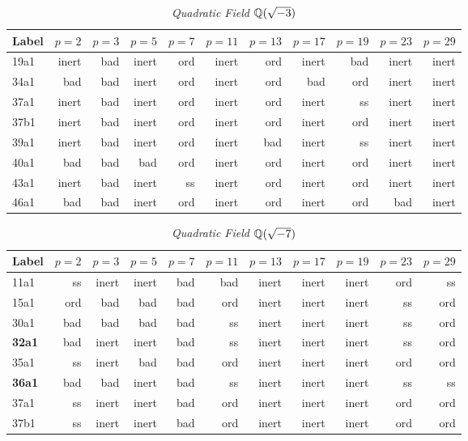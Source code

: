 \documentclass[a4paper,11pt]{article}
\numberwithin{equation}{section}
\begin{document}
\begin{table}[H]	\caption{\label{table:ordinary}\emph{Quadratic Field $\mathbb{Q}(\sqrt{-3})$}}
\begin{tabular}[t]{lrrrrrrrrrr}
	\toprule
Label   &  $p=2$ & $p=3$ & $p=5$ & $p=7$ & $p=11$ & $p=13$ & $p=17$ & $p=19$ & $p=23$ & $p=29$

\\ \midrule 19a1&inert&bad &inert&ord&inert&ord&inert&bad &inert&inert\\ \midrule 34a1&bad &bad &inert&ord&inert&ord&bad &ord&inert&inert\\ \midrule 37a1&inert&bad &inert&ord&inert&ord&inert&ss&inert&inert\\ \midrule 37b1&inert&bad &inert&ord&inert&ord&inert&ord&inert&inert\\ \midrule 39a1&inert&bad &inert&ord&inert&bad &inert&ss&inert&inert\\ \midrule 40a1&bad &bad &bad &ord&inert&ord&inert&ord&inert&inert\\ \midrule 43a1&inert&bad &inert&ss&inert&ord&inert&ord&inert&inert\\ \midrule 46a1&bad &bad &inert&ord&inert&ord&inert&ord&bad &inert

\\
\bottomrule
\end{tabular}
\end{table}

\begin{table}[H]	\caption{\label{table:ordinary}\emph{Quadratic Field $\mathbb{Q}(\sqrt{-7})$}}
\begin{tabular}[t]{lrrrrrrrrrr}
	\toprule
Label   &  $p=2$ & $p=3$ & $p=5$ & $p=7$ & $p=11$ & $p=13$ & $p=17$ & $p=19$ & $p=23$ & $p=29$

\\ \midrule 11a1&ss&inert&inert&bad &bad &inert&inert&inert&ord&ss\\ \midrule 15a1&ord&bad &bad &bad &ord&inert&inert&inert&ss&ord\\ \midrule 30a1&bad &bad &bad &bad &ss&inert&inert&inert&ss&ord\\ \midrule \textbf{32a1}&bad &inert&inert&bad &ss&inert&inert&inert&ss&ord\\ \midrule 35a1&ss&inert&bad &bad &ord&inert&inert&inert&ord&ord\\ \midrule \textbf{36a1}&bad &bad &inert&bad &ss&inert&inert&inert&ss&ss\\ \midrule 37a1&ss&inert&inert&bad &ord&inert&inert&inert&ord&ord\\ \midrule 37b1&ss&inert&inert&bad &ord&inert&inert&inert&ord&ord

\\
\bottomrule
\end{tabular}
\end{table}
\end{document}
